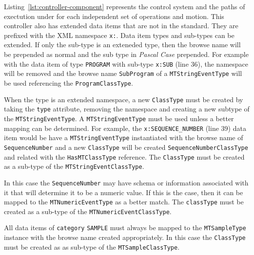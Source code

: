 \FloatBarrier

Listing~\ref{lst:controller-component} represents the control system and the paths of exectution under for each independent set of operations and motion. This controller also has extended data items that are not in the standard. They are prefixed with the XML namespace \texttt{x:}. Data item types and sub-types can be extended. If only the sub-type is an exteneded type, then the browse name will be prepended as normal and the sub type in \textit{Pascal Case} prepended. For example with the data item of type \texttt{PROGRAM} with sub-type \texttt{x:SUB} (line 36), the namespace will be removed and the browse name \texttt{SubProgram} of a \texttt{MTStringEventType} will be used referencing the \texttt{ProgramClassType}. 

When the type is an extended namespace, a new \texttt{ClassType} must be created by taking the \texttt{type} attribute, removing the namespace and creating a new subtype of the \texttt{MTString\-EventType}. A \texttt{MTString\-EventType} must be used unless a better mapping can be determined. For example, the \texttt{x:SEQUENCE_NUMBER} (line 39) data item would be have a \texttt{MTString\-EventType} instantiated with the browse name of \texttt{SequenceNumber} and a new \texttt{ClassType} will be created \texttt{Sequence\-NumberClassType} and related with the \texttt{HasMT\-ClassType} reference. The \texttt{ClassType} must be created as a sub-type of the \texttt{MTStringEventClassType}.

In this case the \texttt{SequenceNumber} may have schema or information associated with it that will determine it to be a numeric value. If this is the case, then it can be mapped to the \texttt{MTNumericEventType} as a better match. The \texttt{classType} must be created as a sub-type of the \texttt{MTNumericEventClassType}.

All data items of \texttt{category} \texttt{SAMPLE} must always be mapped to the \texttt{MTSampleType} instance with the browse name created appropriately. In this case the \texttt{ClassType} must be created as as sub-type of the \texttt{MTSampleClassType}.


